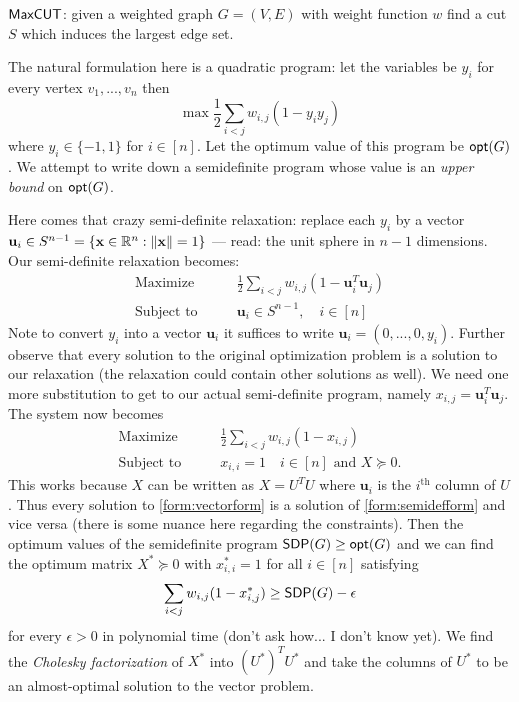 \begin{example}
$\mathsf{MaxCUT}$: given a weighted graph $G = (V,E)$ with weight function $w$ find a cut $S$ which induces the largest edge set. 

The natural formulation here is a quadratic program: let the variables be $y_i$ for every vertex $v_1, ..., v_n$ then 
\[\max \frac{1}{2}\sum_{i < j}w_{i,j}(1 - y_iy_j)\]
where $y_i \in \{-1,1\}$ for $i \in [n]$. Let the optimum value of this program be $\mathsf{opt}(G)$. We attempt to write down a semidefinite program whose value is an \emph{upper bound} on $\mathsf{opt}(G)$. 

Here comes that crazy semi-definite relaxation: replace each $y_i$ by a vector $\mathbf{u}_i \in S^{n-1} = \{\mathbf{x} \in \R^n: \norm{\mathbf{x}} = 1\}$ --- read: the unit sphere in $n-1$ dimensions. Our semi-definite relaxation becomes:
\begin{align}
\label{form:vectorform}
\mbox{Maximize} &\qquad\frac{1}{2}\sum_{i < j} w_{i,j}(1 - \mathbf{u}_i^T\mathbf{u}_j)\\
\mbox{Subject to} &\qquad\mathbf{u}_i \in S^{n-1}, \quad i \in [n]
\end{align}
Note to convert $y_i$ into a vector $\mathbf{u}_i$ it suffices to write $\mathbf{u}_i = (0, ..., 0, y_i)$. Further observe that every solution to the original optimization problem is a solution to our relaxation (the relaxation could contain other solutions as well). We need one more substitution to get to our actual semi-definite program, namely $x_{i,j} = \mathbf{u}_i^T \mathbf{u}_j$. The system now becomes
\begin{align}
\label{form:semidefform}
\mbox{Maximize} &\qquad\frac{1}{2}\sum_{i < j} w_{i,j}(1 - x_{i,j})\\
\mbox{Subject to} &\qquad x_{i,i} = 1 \quad i \in [n] \mbox{ and }  X \succeq 0.
\end{align}
This works because $X$ can be written as $X = U^TU$ where $\mathbf{u}_i$ is the $i^{\text{th}}$ column of $U$. Thus every solution to \ref{form:vectorform} is a solution of \ref{form:semidefform} and vice versa (there is some nuance here regarding the constraints). Then the optimum values of the semidefinite program $\mathsf{SDP}(G) \geq \mathsf{opt}(G)$ and we can find the optimum matrix $X^* \succeq 0$ with $x_{i,i}^* = 1$ for all $i \in [n]$ satisfying 
\[\sum_{i < j} w_{i,j}(1 - x_{i,j}^*) \geq \mathsf{SDP}(G) - \epsilon\]
for every $\epsilon > 0$ in polynomial time (don't ask how... I don't know yet). We find the \emph{Cholesky factorization} of $X^*$ into $(U^*)^TU^*$ and take the columns of $U^*$ to be an almost-optimal solution to the vector problem.


\end{example}
